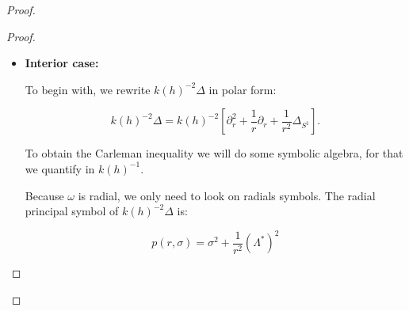 \documentclass[leqno,11pt,letterpaper, english]{amsart}
\theoremstyle{plain}
\theoremstyle{definition}
\numberwithin{equation}{section}
\def\R{\mathbb R}
\begin{document}
\begin{proof}
\begin{proof}

			
			\begin{itemize}
				\item \textbf{Interior case:}
				
				To begin with, we rewrite $k(h)^{-2}\Delta$ in polar form:
				
				\begin{equation}
					k(h)^{-2}\Delta= k(h)^{-2} \left[\partial_r^2 +\frac{1}{r}\partial_r +\frac{1}{r^2}\Delta_{S^{1}} \right].
				\end{equation}
				
				To obtain the Carleman inequality we will do some symbolic algebra, for that we quantify in $k(h)^{-1}$.
				
				
				
				Because $\omega$ is radial, we only need to look on radials symbols.
				The radial principal symbol of $k(h)^{-2}\Delta$ is:
				
				\begin{equation}
					p(r,\sigma)= \sigma^2 + \frac{1}{r^2}(\Lambda^*)^2
				\end{equation}
				

\end{itemize}
\end{proof}
\end{proof}
\end{document}
